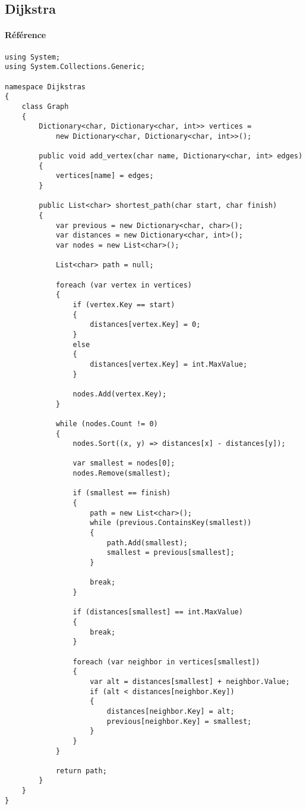 \newpage
\subsection{Dijkstra}
\paragraph{Référence} \cite{Algorithm3}
\begin{lstlisting}
using System;
using System.Collections.Generic;

namespace Dijkstras
{
    class Graph
    {
        Dictionary<char, Dictionary<char, int>> vertices =
            new Dictionary<char, Dictionary<char, int>>();

        public void add_vertex(char name, Dictionary<char, int> edges)
        {
            vertices[name] = edges;
        }

        public List<char> shortest_path(char start, char finish)
        {
            var previous = new Dictionary<char, char>();
            var distances = new Dictionary<char, int>();
            var nodes = new List<char>();

            List<char> path = null;

            foreach (var vertex in vertices)
            {
                if (vertex.Key == start)
                {
                    distances[vertex.Key] = 0;
                }
                else
                {
                    distances[vertex.Key] = int.MaxValue;
                }

                nodes.Add(vertex.Key);
            }

            while (nodes.Count != 0)
            {
                nodes.Sort((x, y) => distances[x] - distances[y]);

                var smallest = nodes[0];
                nodes.Remove(smallest);

                if (smallest == finish)
                {
                    path = new List<char>();
                    while (previous.ContainsKey(smallest))
                    {
                        path.Add(smallest);
                        smallest = previous[smallest];
                    }

                    break;
                }

                if (distances[smallest] == int.MaxValue)
                {
                    break;
                }

                foreach (var neighbor in vertices[smallest])
                {
                    var alt = distances[smallest] + neighbor.Value;
                    if (alt < distances[neighbor.Key])
                    {
                        distances[neighbor.Key] = alt;
                        previous[neighbor.Key] = smallest;
                    }
                }
            }

            return path;
        }
    }
}
\end{lstlisting}

